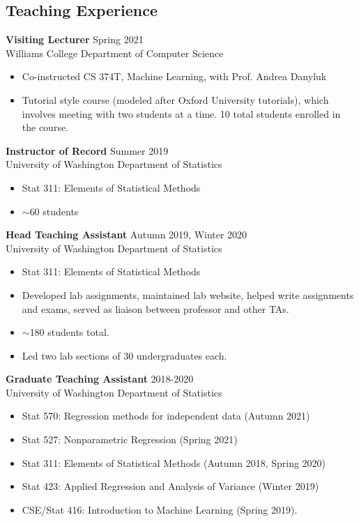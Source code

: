 \documentclass[margin, 10pt]{res} %
\begin{document}
\begin{resume}
{\section{Teaching Experience}
{\textbf{Visiting Lecturer}} \hfill Spring 2021 \\
Williams College Department of Computer Science
\begin{itemize}
\item Co-instructed CS 374T, Machine Learning, with Prof. Andrea Danyluk
\item Tutorial style course (modeled after Oxford University tutorials), which involves meeting with two students at a time. 10 total students enrolled in the course. 
\end{itemize}
{\textbf{Instructor of Record}} \hfill Summer 2019 \\
University of Washington Department of Statistics
\begin{itemize}
\item Stat 311: Elements of Statistical Methods
\item $\sim$60 students
\end{itemize}
{\textbf{Head Teaching Assistant}} \hfill Autumn 2019, Winter 2020 \\
University of Washington Department of Statistics
\begin{itemize}
\item Stat 311: Elements of Statistical Methods
\item Developed lab assignments, maintained lab website, helped write assignments and exams, served as liaison between professor and other TAs.  
\item $\sim$180 students total. 
\item Led two lab sections of 30 undergraduates each. 
\end{itemize} 
{\textbf{Graduate Teaching Assistant}} \hfill 2018-2020\\
University of Washington Department of Statistics
\begin{itemize}
\item Stat 570: Regression methods for independent data (Autumn 2021)
\item Stat 527: Nonparametric Regression (Spring 2021)
\item Stat 311: Elements of Statistical Methods (Autumn 2018, Spring 2020)
\item Stat 423:  Applied Regression and Analysis of Variance (Winter 2019)
\item CSE/Stat 416: Introduction to Machine Learning (Spring 2019). 

\end{itemize}}
\end{resume}
\end{document}
